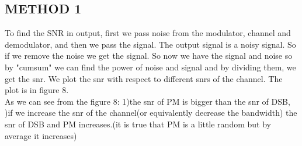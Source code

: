 \documentclass[11pt]{article}
\begin{document}
\begin{question}
\begin{subquestion}
{\section*{METHOD 1}
To find the SNR in output, first we pass noise from the modulator, channel and demodulator, and then we pass the signal. The output signal is a noisy signal. So if we remove the noise we get the signal. So now we have the signal and noise so by "cumsum" we can find the power of noise and signal and by dividing them, we get the snr. We plot the snr with respect to different snrs of the channel. The plot is in figure 8.\\
As we can see from the figure 8: 1)the snr of PM is bigger than the snr of DSB,
\;\;\;\;\;\;\;\;\;\;\;\;\;\;\;)if we increase the snr of the channel(or equivalently decrease the bandwidth) the snr of DSB and PM increases.(it is true that PM is a little random but by average it increases)


}
\end{subquestion}
\end{question}
\end{document}

